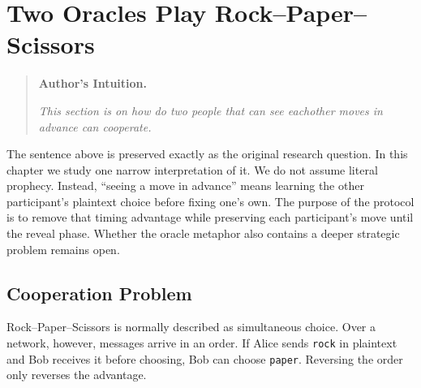 \chapter{Two Oracles Play Rock--Paper--Scissors}
\label{chap:two-oracles-rps}

\begin{quote}
\textbf{Author's Intuition.}

\emph{This section is on how do two people that can see eachother moves in advance can cooperate.}
\end{quote}

The sentence above is preserved exactly as the original research question. In
this chapter we study one narrow interpretation of it. We do not assume literal
prophecy. Instead, ``seeing a move in advance'' means learning the other
participant's plaintext choice before fixing one's own. The purpose of the
protocol is to remove that timing advantage while preserving each
participant's move until the reveal phase. Whether the oracle metaphor also
contains a deeper strategic problem remains open.

\begin{abstract}
This chapter gives an educational two-party commit--reveal protocol for
Rock--Paper--Scissors. Alice and Bob each fix a private move, exchange
session-bound commitments, and reveal only after both commitments have been
accepted. A valid reveal is checked against the corresponding prior
commitment. The construction replaces a trusted referee's early collection of
plaintext moves, but it does not reproduce a referee's ability to release both
moves fairly. In particular, the participant who receives the first reveal can
learn the result and then refuse to reveal. The chapter therefore treats
selective abort as a central counterexample, not as a minor implementation
detail. The companion C code is an instructional state machine, not a
production protocol, and the exact hash-based commitment has a limited
random-oracle-style security argument rather than a formal proof.
\end{abstract}

\section{Cooperation Problem}

Rock--Paper--Scissors is normally described as simultaneous choice. Over a
network, however, messages arrive in an order. If Alice sends
\texttt{rock} in plaintext and Bob receives it before choosing, Bob can choose
\texttt{paper}. Reversing the order only reverses the advantage.

